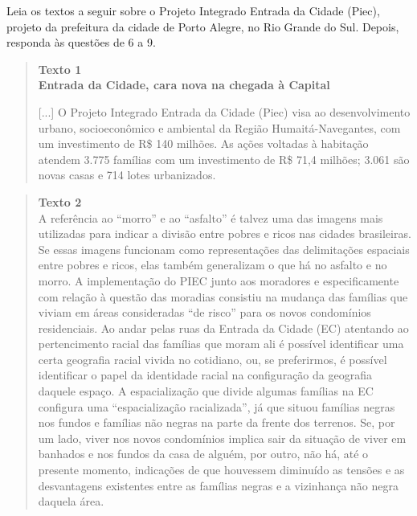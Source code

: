 \begin{itemize}
\begin{itemize}
\begin{itemize}
Leia os textos a seguir sobre o Projeto Integrado Entrada da Cidade
(Piec), projeto da prefeitura da cidade de Porto Alegre, no Rio Grande
do Sul. Depois, responda às questões de 6 a 9.

\begin{quote}
\textbf{Texto 1}\\
\textbf{Entrada da Cidade, cara nova na chegada à Capital}

[...] O Projeto Integrado Entrada da Cidade (Piec) visa ao desenvolvimento
urbano, socioeconômico e ambiental da Região Humaitá-Navegantes, com um
investimento de R\$ 140 milhões. As ações voltadas à habitação atendem
3.775 famílias com um investimento de R\$ 71,4 milhões; 3.061 são novas
casas e 714 lotes urbanizados.

\end{quote}

\begin{quote}
\textbf{Texto 2}\\
A referência ao ``morro'' e ao ``asfalto'' é talvez uma das imagens mais
utilizadas para indicar a divisão entre pobres e ricos nas cidades
brasileiras. Se essas imagens funcionam como representações das
delimitações espaciais entre pobres e ricos, elas também generalizam o
que há no asfalto e no morro. A implementação do PIEC junto aos
moradores e especificamente com relação à questão das moradias consistiu
na mudança das famílias que viviam em áreas consideradas ``de risco''
para os novos condomínios residenciais. Ao andar pelas ruas da Entrada
da Cidade (EC) atentando ao pertencimento racial das famílias que moram
ali é possível identificar uma certa geografia racial vivida no
cotidiano, ou, se preferirmos, é possível identificar o papel da
identidade racial na configuração da geografia daquele espaço. A
espacialização que divide algumas famílias na EC configura uma
``espacialização racializada'', já que situou famílias negras nos fundos
e famílias não negras na parte da frente dos terrenos. Se, por um lado,
viver nos novos condomínios implica sair da situação de viver em
banhados e nos fundos da casa de alguém, por outro, não há, até o
presente momento, indicações de que houvessem diminuído as tensões e as
desvantagens existentes entre as famílias negras e a vizinhança
não negra daquela área.

\end{quote}


\end{itemize}
\end{itemize}
\end{itemize}

